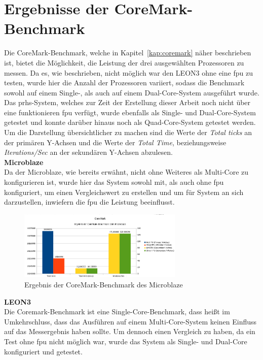 \section{Ergebnisse der CoreMark-Benchmark}\label{kap:coremarktest}
Die CoreMark-Benchmark, welche in Kapitel~\ref{kap:coremark} näher beschrieben ist, bietet die Möglichkeit, die Leistung der drei ausgewählten Prozessoren zu messen. Da es, wie beschrieben,
nicht möglich war den LEON3 ohne eine \ac{fpu} zu testen, wurde hier die Anzahl der Prozessoren variiert, sodass die Benchmark sowohl auf einem Single-, als auch auf einem Dual-Core-System
ausgeführt wurde.\\
Das \ac{prhs}-System, welches zur Zeit der Erstellung dieser Arbeit noch nicht über eine funktionieren \ac{fpu} verfügt, wurde ebenfalls als Single- und Dual-Core-System getestet und konnte
darüber hinaus noch als Quad-Core-System getestet werden.\\
Um die Darstellung übersichtlicher zu machen sind die Werte der \emph{Total ticks} an der primären Y-Achsen und die Werte der \emph{Total Time}, beziehungsweise \emph{Iterations/Sec}
an der sekundären Y-Achsen abzulesen.\\

\textbf{Microblaze}\\
Da der Microblaze, wie bereits erwähnt, nicht ohne Weiteres als Multi-Core zu konfigurieren ist, wurde hier das System sowohl mit, als auch ohne \ac{fpu} konfiguriert, um einen
Vergleichswert zu erstellen und um für System an sich darzustellen, inwiefern die \ac{fpu} die Leistung beeinflusst.\\

\begin{figure}[H]
\centering
\includegraphics[width=0.7\textwidth]{Hauptteil/coremarkmb.png}
\caption{Ergebnis der CoreMark-Benchmark des Microblaze}
\label{fig:coremarkmb}
\end{figure}


\textbf{LEON3}\\
Die Coremark-Benchmark ist eine Single-Core-Benchmark, dass heißt im Umkehrschluss, dass das Ausführen auf einem Multi-Core-System keinen Einfluss auf das Messergebnis haben sollte.
Um dennoch einen Vergleich zu haben, da ein Test ohne \ac{fpu} nicht möglich war, wurde das System als Single- und Dual-Core konfiguriert und getestet.\\


